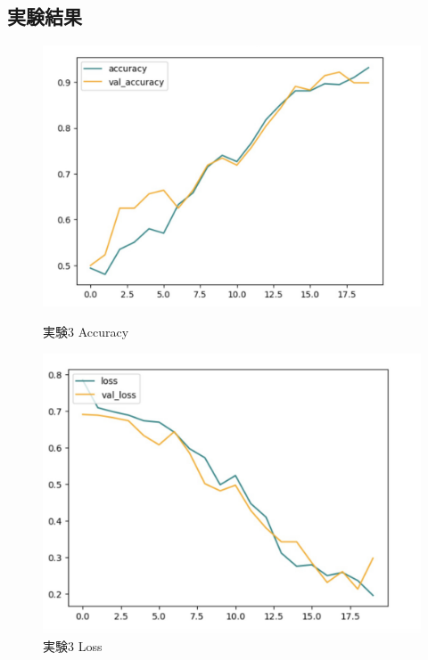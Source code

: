 \documentclass[a4paper, 11pt, titlepage]{jsarticle}
\begin{document}
\clearpage

\subsection{実験結果}
\begin{figure}[htbp]
  \begin{minipage}[b]{0.45\linewidth}
    \centering
    \includegraphics[keepaspectratio, scale=0.161]{ex3_acc.jpg}
    \caption{実験3 Accuracy}
  \end{minipage}
  \begin{minipage}[b]{0.45\linewidth}
    \centering
    \includegraphics[keepaspectratio, scale=0.161]{ex3_loss.jpg}
    \caption{実験3 Loss}
  \end{minipage}
\end{figure}
\end{document}
